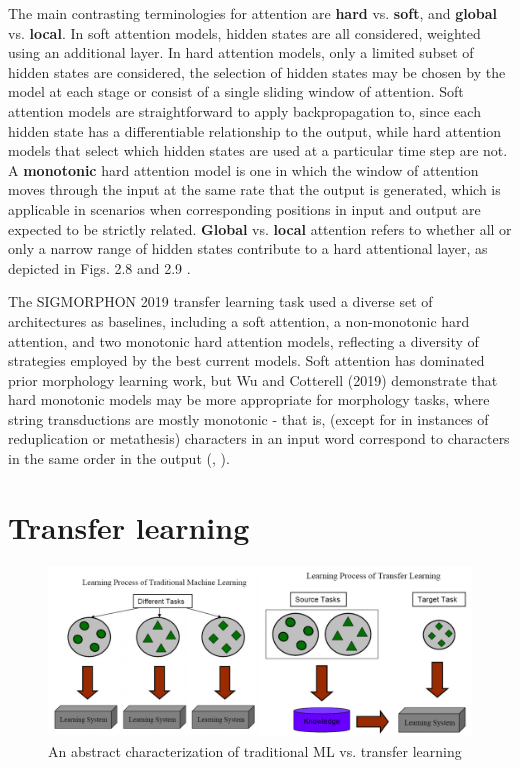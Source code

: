 The main contrasting terminologies for attention are \textbf{hard} vs. \textbf{soft}, and \textbf{global} vs. \textbf{local}. In soft attention models, hidden states are all considered, weighted using an additional layer. In hard attention models, only a limited subset of hidden states are considered, the selection of hidden states may be chosen by the model at each stage or consist of a single sliding window of attention. Soft attention models are straightforward to apply backpropagation to, since each hidden state has a differentiable relationship to the output, while hard attention models that select which hidden states are used at a particular time step are not. A \textbf{monotonic} hard attention model is one in which the window of attention moves through the input at the same rate that the output is generated, which is applicable in scenarios when corresponding positions in input and output are expected to be strictly related. \textbf{Global} vs. \textbf{local} attention refers to whether all or only a narrow range of hidden states contribute to a hard attentional layer, as depicted in Figs. 2.8 and 2.9 \parencite{Luong2015}. 

The SIGMORPHON 2019 transfer learning task used a diverse set of architectures as baselines, including a soft attention, a non-monotonic hard attention, and two monotonic hard attention models, reflecting a diversity of strategies employed by the best current models. Soft attention has dominated prior morphology learning work, but Wu and Cotterell (2019) demonstrate that hard monotonic models may be more appropriate for morphology tasks, where string transductions are mostly monotonic - that is, (except for in instances of reduplication or metathesis) characters in an input word correspond to characters in the same order in the output (\cite{McCarthy2019}, \cite{Wu2019}).

\section{Transfer learning}

\begin{figure}[t]
\includegraphics[width=12cm]{images/transfer_learning.png}
\centering
\caption{An abstract characterization of traditional ML vs. transfer learning}
\end{figure}

